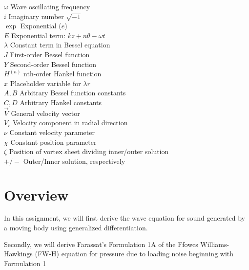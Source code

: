 \documentclass[]{aiaa-tc}%
\begin{document}
\begin{multicols}{2}
\begin{tabbing}
  $\omega$            \> Wave oscillating frequency \\
  $i$                 \> Imaginary number $\sqrt{-1}$ \\
  $\exp$              \> Exponential ($e$) \\
  $E$                 \> Exponential term: $kz + n\theta -\omega t$ \\
  $\lambda$           \> Constant term in Bessel equation \\
  $J$                 \> First-order Bessel function \\
  $Y$                 \> Second-order Bessel function \\
  $H^{(n)}$           \> nth-order Hankel function \\
  $x$                 \> Placeholder variable for $\lambda r$ \\
  $A,B$               \> Arbitrary Bessel function constants \\
  $C,D$               \> Arbitrary Hankel constants \\
  $\vec{V}$           \> General velocity vector \\
  $V_r$               \> Velocity component in radial direction \\
  $\nu$               \> Constant velocity parameter \\
  $\chi$              \> Constant position parameter \\
  $\zeta$             \> Position of vortex sheet dividing inner/outer solution \\
  $+/-$               \> Outer/Inner solution, respectively \\





\end{tabbing}

\end{multicols}

\section*{Overview} %

In this assignment, we will first derive the wave equation for sound generated by a moving body using generalized differentiation.

Secondly, we will derive Farassat's Formulation 1A of the Ffowcs Williams-Hawkings (FW-H) equation for pressure due to loading noise beginning with Formulation 1
\end{document}
